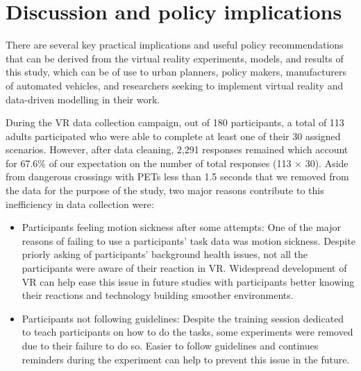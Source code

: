 \section{Discussion and policy implications}
\label{S:discuss}
There are several key practical implications and useful policy recommendations that can be derived from the virtual reality experiments, models, and results of this study, which can be of use to urban planners, policy makers, manufacturers of automated vehicles, and researchers seeking to implement virtual reality and data-driven modelling in their work.

During the VR data collection campaign, out of 180 participants, a total of 113 adults participated who were able to complete at least one of their 30 assigned scenarios. However, after data cleaning, 2,291 responses remained which account for 67.6\% of our expectation on the number of total responses (113 $\times$ 30). Aside from dangerous crossings with PETs less than 1.5 seconds that we removed from the data for the purpose of the study, two major reasons contribute to this inefficiency in data collection were:
\begin{itemize}
    \item Participants feeling motion sickness after some attempts: One of the major reasons of failing to use a participants' task data was motion sickness. Despite priorly asking of participants' background health issues, not all the participants were aware of their reaction in VR. Widespread development of VR can help ease this issue in future studies with participants better knowing their reactions and technology building smoother environments.
    \item Participants not following guidelines: Despite the training session dedicated to teach participants on how to do the tasks, some experiments were removed due to their failure to do so. Easier to follow guidelines and continues reminders during the experiment can help to prevent this issue in the future. 
\end{itemize}

